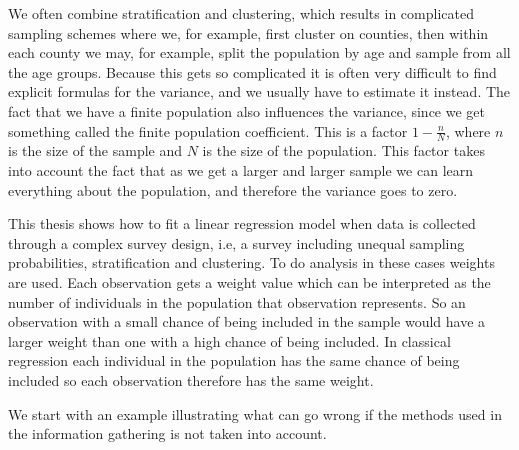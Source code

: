 \documentclass{article}
\begin{document}
We often combine stratification and clustering, which results in complicated
sampling schemes where we, for example, first cluster on counties, then within
each county we may, for example, split the population by age and sample from all
the age groups. Because this gets so complicated it is often very difficult to
find explicit formulas for the variance, and we usually have to estimate it
instead. 
The fact that we have a finite population also influences the variance, since we
get something called the finite population coefficient. This is a factor \(1 -
\frac{n}{N}\), where \(n\) is the size of the sample and \(N\) is the size of
the population. This factor takes into account the fact that as we get a larger
and larger sample we can learn everything about the population, and therefore
the variance goes to zero.


This thesis shows how to fit
a linear regression model when data is collected through a complex survey design, i.e,
a survey including unequal sampling probabilities, stratification and
clustering. To do analysis in these cases weights are used. Each observation gets a weight
value which can be interpreted as the number of individuals in the population
that observation represents. So an observation with a small chance of being
included in the sample would have a larger weight than one with a high chance of
being included.
In classical regression each individual in the population has the same chance of
being included so each observation therefore has the same weight.

We start
with an example illustrating what can go wrong if the methods used in the
information gathering is not taken into account.
\end{document}
